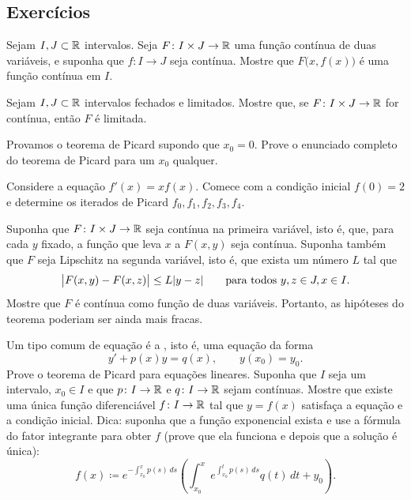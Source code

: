 \subsection{Exercícios}

\begin{exercise}
Sejam $I, J \subset {\mathbb{R}}$ intervalos.
Seja $F \colon I \times J \to {\mathbb{R}}$ uma função contínua de duas variáveis,
e suponha que $f \colon I \to J$ seja contínua.
Mostre que $F\bigl(x,f(x)\bigr)$ é uma função contínua em $I$.
\end{exercise}

\begin{exercise}
Sejam $I, J \subset {\mathbb{R}}$ intervalos fechados e limitados.
Mostre que, se $F \colon I \times J \to {\mathbb{R}}$ for contínua, então $F$ é
limitada.
\end{exercise}

\begin{exercise}
Provamos o teorema de Picard supondo que $x_0 = 0$.
Prove o enunciado completo do teorema de Picard para um $x_0$ qualquer.
\end{exercise}

\begin{exercise}
Considere a equação $f'(x)=x f(x)$. Comece com a condição inicial
$f(0)=2$ e determine os iterados de Picard $f_0,f_1,f_2,f_3,f_4$.
\end{exercise}

\begin{exercise}
Suponha que $F \colon I \times J \to {\mathbb{R}}$ seja contínua na primeira
variável, isto é, que, para cada $y$ fixado, a função que leva $x$ a
$F(x,y)$ seja contínua. Suponha também que $F$ seja Lipschitz na segunda
variável, isto é, que exista um número $L$ tal que
\begin{equation*}
\bigl\lvert {F(x,y) - F(x,z)} \bigr\rvert \leq L \lvert {y-z} \rvert
\qquad \text{para todos } y,z \in J, x \in I .
\end{equation*}
Mostre que $F$ é contínua como função de duas variáveis. Portanto, as
hipóteses do teorema poderiam ser ainda mais fracas.
\end{exercise}

\begin{exercise}
\pagebreak[2]
Um tipo comum de equação é a
\emph{}, isto é,
uma equação da forma
\begin{equation*}
y' + p(x) y = q(x) , \qquad y(x_0) = y_0 .
\end{equation*}
Prove o teorema de Picard para equações lineares. Suponha que $I$ seja um
intervalo, $x_0 \in I$ e que $p \colon I \to {\mathbb{R}}$ e $q \colon I \to {\mathbb{R}}$
sejam contínuas.
Mostre que existe uma única função diferenciável $f \colon I \to {\mathbb{R}}$ tal
que $y = f(x)$ satisfaça a equação e a condição inicial.
Dica: suponha que a função exponencial exista e use a fórmula do fator
integrante para obter $f$ (prove que ela funciona e depois que a solução é
única):
\begin{equation*}
f(x) \coloneqq e^{-\int_{x_0}^x p(s)\, ds} \left( \int_{x_0}^x e^{\int_{x_0}^t p(s)\, ds}
q(t) \,dt + y_0 \right).
\end{equation*}
\end{exercise}

